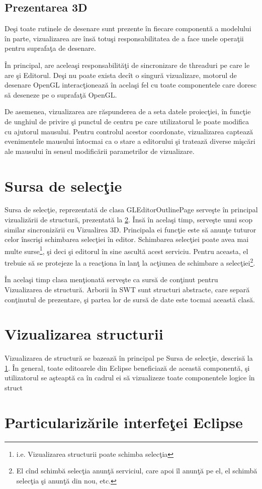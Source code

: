 \subsection{Prezentarea 3D}
Deşi toate rutinele de desenare sunt prezente în fiecare componentă a modelului
în parte, vizualizarea are însă totuşi responsabilitatea de a face unele
operaţii pentru suprafaţa de desenare.

În principal, are aceleaşi responsabilităţi de sincronizare de threaduri pe care
le are şi Editorul. Deşi nu poate exista decît o singură vizualizare, motorul de
desenare OpenGL interacţionează în acelaşi fel cu toate componentele care doresc
să deseneze pe o suprafaţă OpenGL.

De asemenea, vizualizarea are răspunderea de a seta datele proiecţiei, în
funcţie de unghiul de privire şi punctul de centru pe care utilizatorul le poate
modifica cu ajutorul mausului. Pentru controlul acestor coordonate, vizualizarea
captează evenimentele mausului întocmai ca o stare a editorului şi tratează
diverse mişcări ale mausului în sensul modificării parametrilor de vizualizare.

\section{Sursa de selecţie}
\label{section:impl-selecta}
Sursa de selecţie, reprezentată de clasa GLEditorOutlinePage serveşte în 
principal vizualizării de structură, prezentată la \ref{section:impl-outline}. 
Însă în acelaşi timp, serveşte unui scop similar sincronizării cu Vizualirea 
3D. Principala ei funcţie este să anunţe tuturor celor înscrişi schimbarea 
selecţiei în editor. Schimbarea selecţiei poate avea mai multe 
surse\footnote{i.e. Vizualizarea structurii poate schimba selecţia}, şi deci şi 
editorul în sine ascultă acest serviciu. Pentru aceasta, el trebuie să se
protejeze la a reacţiona în lanţ la acţiunea de schimbare a
selecţiei\footnote{El cînd schimbă selecţia anunţă serviciul, care apoi îl
anunţă pe el, el schimbă selecţia şi anunţă din nou, etc.}.

În acelaşi timp clasa menţionată serveşte ca sursă de conţinut pentru
Vizualizarea de structură. Arborii în SWT sunt structuri abstracte, care separă
conţinutul de prezentare, şi partea lor de sursă de date este tocmai această
clasă.

\section{Vizualizarea structurii}
\label{section:impl-outline}

Vizualizarea de structură se bazează în principal pe Sursa de selecţie, descrisă
la \ref{section:impl-selecta}. În general, toate editoarele din Eclipse
beneficiază de această componentă, şi utilizatorul se aşteaptă ca în cadrul ei
să vizualizeze toate componentele logice în struct

\section{Particularizările interfeţei Eclipse}
